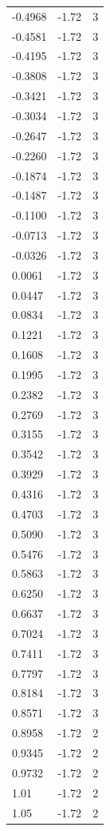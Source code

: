 \begin{longtable}{lrr}
  -0.4968 & -1.72 & 3 \\
  -0.4581 & -1.72 & 3 \\
  -0.4195 & -1.72 & 3 \\
  -0.3808 & -1.72 & 3 \\
  -0.3421 & -1.72 & 3 \\
  -0.3034 & -1.72 & 3 \\
  -0.2647 & -1.72 & 3 \\
  -0.2260 & -1.72 & 3 \\
  -0.1874 & -1.72 & 3 \\
  -0.1487 & -1.72 & 3 \\
  -0.1100 & -1.72 & 3 \\
  -0.0713 & -1.72 & 3 \\
  -0.0326 & -1.72 & 3 \\
  0.0061 & -1.72 & 3 \\
  0.0447 & -1.72 & 3 \\
  0.0834 & -1.72 & 3 \\
  0.1221 & -1.72 & 3 \\
  0.1608 & -1.72 & 3 \\
  0.1995 & -1.72 & 3 \\
  0.2382 & -1.72 & 3 \\
  0.2769 & -1.72 & 3 \\
  0.3155 & -1.72 & 3 \\
  0.3542 & -1.72 & 3 \\
  0.3929 & -1.72 & 3 \\
  0.4316 & -1.72 & 3 \\
  0.4703 & -1.72 & 3 \\
  0.5090 & -1.72 & 3 \\
  0.5476 & -1.72 & 3 \\
  0.5863 & -1.72 & 3 \\
  0.6250 & -1.72 & 3 \\
  0.6637 & -1.72 & 3 \\
  0.7024 & -1.72 & 3 \\
  0.7411 & -1.72 & 3 \\
  0.7797 & -1.72 & 3 \\
  0.8184 & -1.72 & 3 \\
  0.8571 & -1.72 & 3 \\
  0.8958 & -1.72 & 2 \\
  0.9345 & -1.72 & 2 \\
  0.9732 & -1.72 & 2 \\
  1.01 & -1.72 & 2 \\
  1.05 & -1.72 & 2 \\

\end{longtable}

